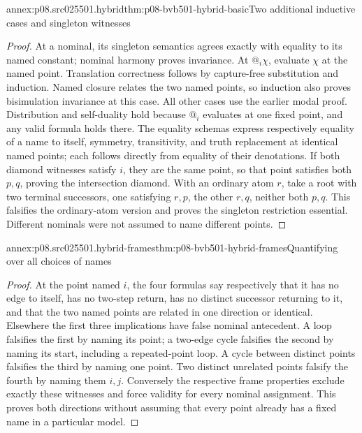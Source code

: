 \begin{annexitem}{annex:p08.src025501.hybrid}{thm:p08-bvb501-hybrid-basic}{Two additional inductive cases and singleton witnesses}
\begin{proof}
At a nominal, its singleton semantics agrees exactly with equality to
its named constant; nominal harmony proves invariance. At \(@_i\chi\),
evaluate \(\chi\) at the named point. Translation correctness
follows by capture-free substitution and induction. Named closure
relates the two named points, so induction also proves bisimulation
invariance at this case. All other cases use the earlier modal proof.
Distribution and self-duality hold because \(@_i\) evaluates at one
fixed point, and any valid formula holds there. The equality schemas
express respectively equality of a name to itself, symmetry, transitivity,
and truth replacement at identical named points; each follows directly
from equality of their denotations. If both diamond witnesses satisfy
\(i\), they are the same point, so that point satisfies both
\(p,q\), proving the intersection diamond. With an ordinary atom
\(r\), take a root with two terminal successors, one satisfying
\(r,p\), the other \(r,q\), neither both \(p,q\). This
falsifies the ordinary-atom version and proves the singleton restriction
essential. Different nominals were not assumed to name different points.
\end{proof}
\end{annexitem}

\begin{annexitem}{annex:p08.src025501.hybrid-frames}{thm:p08-bvb501-hybrid-frames}{Quantifying over all choices of names}
\begin{proof}
At the point named \(i\), the four formulas say respectively that
it has no edge to itself, has no two-step return, has no distinct
successor returning to it, and that the two named points are related
in one direction or identical. Elsewhere the first three implications
have false nominal antecedent. A loop falsifies the first by naming
its point; a two-edge cycle falsifies the second by naming its start,
including a repeated-point loop. A cycle between distinct points
falsifies the third by naming one point. Two distinct unrelated points
falsify the fourth by naming them \(i,j\). Conversely the respective
frame properties exclude exactly these witnesses and force validity
for every nominal assignment. This proves both directions without
assuming that every point already has a fixed name in a particular model.
\end{proof}
\end{annexitem}

